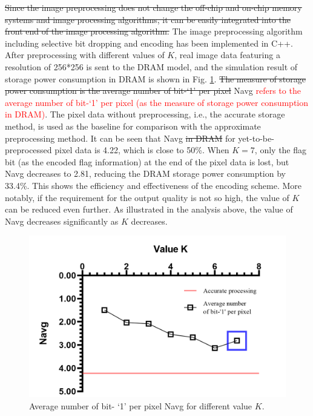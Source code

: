 \documentclass[lettersize,journal]{IEEEtran}
\begin{document}
{\color{red}\sout{Since the image preprocessing does not change the off-chip and on-chip memory systems and image processing algorithms, it can be easily integrated into the front end of the image processing algorithm.}} The image preprocessing algorithm including selective bit dropping and encoding has been implemented in C++. After preprocessing with different values of $K$, real image data featuring a resolution of 256*256 is sent to the DRAM model, and the simulation result of storage power consumption in DRAM is shown in Fig. \ref{fig7}. {\color{red}\sout{The measure of storage power consumption is the average number of bit-`1' per pixel}} Navg \textcolor{red}{refers to the average number of bit-`1' per pixel (as the measure of storage power consumption in DRAM)}. The pixel data without preprocessing, i.e., the accurate storage method, is used as the baseline for comparison with the approximate preprocessing method. It can be seen that Navg {\color{red}\sout{in DRAM}} for yet-to-be-preprocessed pixel data is 4.22, which is close to 50\%. When $K=7$, only the flag bit (as the encoded flag information) at the end of the pixel data is lost, but Navg decreases to 2.81, reducing the DRAM storage power consumption by 33.4\%. This shows the efficiency and effectiveness of the encoding scheme. More notably, if the requirement for the output quality is not so high, the value of $K$ can be reduced even further. As illustrated in the analysis above, the value of Navg decreases significantly as $K$ decreases.
\begin{figure}[htb]
\centering
\includegraphics[width=\linewidth]{Fig/Average number of bit- `1' per pixel Navg for different value k.png}
\caption{Average number of bit- `1' per pixel Navg for different value $K$.}
\label{fig7}
\end{figure}
\end{document}
